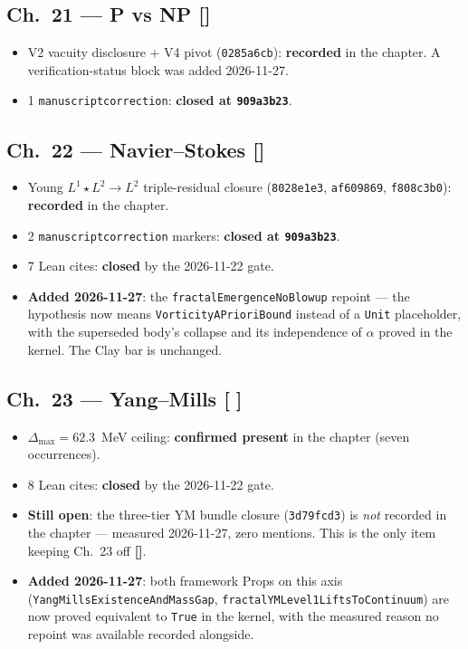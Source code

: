 \subsection*{Ch.~21 --- P vs NP \hfill [\checkmark]}
\begin{itemize}
\item V2 vacuity disclosure + V4 pivot (\texttt{0285a6cb}):
\textbf{recorded} in the chapter. A verification-status block was added
2026-11-27.
\item 1 \texttt{manuscriptcorrection}: \textbf{closed at \texttt{909a3b23}}.
\end{itemize}

\subsection*{Ch.~22 --- Navier--Stokes \hfill [\checkmark]}
\begin{itemize}
\item Young $L^1 \star L^2 \to L^2$ triple-residual closure
(\texttt{8028e1e3}, \texttt{af609869}, \texttt{f808c3b0}):
\textbf{recorded} in the chapter.
\item 2 \texttt{manuscriptcorrection} markers: \textbf{closed at
\texttt{909a3b23}}.
\item 7 Lean cites: \textbf{closed} by the 2026-11-22 gate.
\item \textbf{Added 2026-11-27}: the \texttt{fractalEmergenceNoBlowup} repoint
--- the hypothesis now means \texttt{VorticityAPrioriBound} instead of a
\texttt{Unit} placeholder, with the superseded body's collapse and its
independence of $\alpha$ proved in the kernel. The Clay bar is unchanged.
\end{itemize}

\subsection*{Ch.~23 --- Yang--Mills \hfill [\,\,]}
\begin{itemize}
\item $\Delta_{\max} = 62.3$~MeV ceiling: \textbf{confirmed present} in the
chapter (seven occurrences).
\item 8 Lean cites: \textbf{closed} by the 2026-11-22 gate.
\item \textbf{Still open}: the three-tier YM bundle closure
(\texttt{3d79fcd3}) is \emph{not} recorded in the chapter --- measured
2026-11-27, zero mentions. This is the only item keeping Ch.~23 off
\textbf{[\checkmark]}.
\item \textbf{Added 2026-11-27}: both framework Props on this axis
(\texttt{YangMillsExistenceAndMassGap},
\texttt{fractalYMLevel1LiftsToContinuum}) are now proved equivalent to
\texttt{True} in the kernel, with the measured reason no repoint was available
recorded alongside.
\end{itemize}

